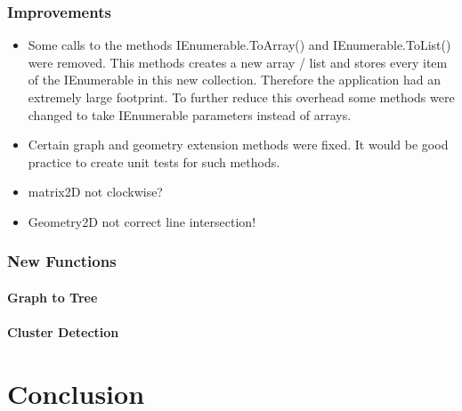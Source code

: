 \documentclass[11pt, a4paper]{report}
\begin{document}
\subsection{Improvements}
\begin{itemize}
    \item Some calls to the methods IEnumerable.ToArray() and IEnumerable.ToList() were removed. This methods creates a new array / list and stores every item of the IEnumerable in this new collection. Therefore the application had an extremely large footprint. To further reduce this overhead some methods were changed to take IEnumerable parameters instead of arrays.
    \item Certain graph and geometry extension methods were fixed. It would be good practice to create unit tests for such methods.
    \item matrix2D not clockwise?
    \item Geometry2D not correct line intersection!
\end{itemize}


\subsection{New Functions}
\subsubsection{Graph to Tree}
\subsubsection{Cluster Detection}

\chapter{Conclusion}


\appendix
\glsaddall
\printglossaries
\end{document}

